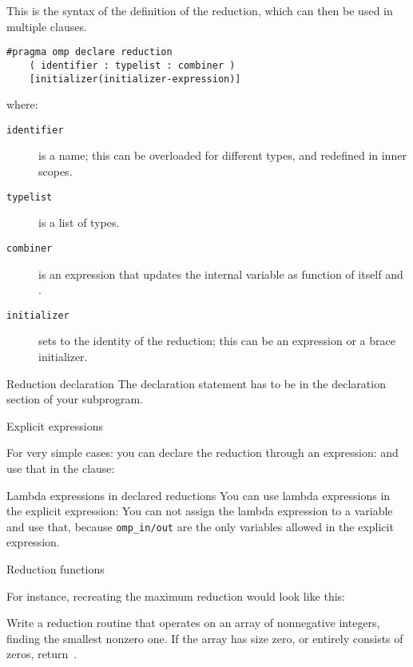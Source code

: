 This is the syntax of the definition of the reduction, which can then
be used in multiple  clauses.
\begin{lstlisting}
#pragma omp declare reduction 
    ( identifier : typelist : combiner )
    [initializer(initializer-expression)]
\end{lstlisting}
where:
\begin{description}
  \item[\texttt{identifier}] is a name; this can be overloaded for
    different types, and redefined in inner scopes.
  \item[\texttt{typelist}] is a list of types.
  \item[\texttt{combiner}] is an expression that updates the internal
    variable  as function of itself and .
  \item[\texttt{initializer}] sets  to the
    identity of the reduction; this
    can be an expression or a brace initializer.
\end{description}

\begin{fortrannote}{Reduction declaration}
  The declaration statement has to be in the declaration section of your subprogram.
\end{fortrannote}

 {Explicit expressions}

For very simple cases:
%
%
you can declare the reduction through an expression:
%
%
and use that in the  clause:
%

\begin{cppnote}{Lambda expressions in declared reductions}
  You can use lambda expressions in the explicit expression:
  You can not assign the lambda expression to a variable and use that,
  because \lstinline{omp_in/out} are the only variables allowed
  in the explicit expression.
\end{cppnote}

 {Reduction functions}

For instance, recreating the maximum reduction would look like this:
%

\begin{exercise}
  Write a reduction routine that operates on an array of nonnegative
  integers, finding the smallest nonzero one. If the array has size
  zero, or entirely consists of zeros, return~.
\end{exercise}

